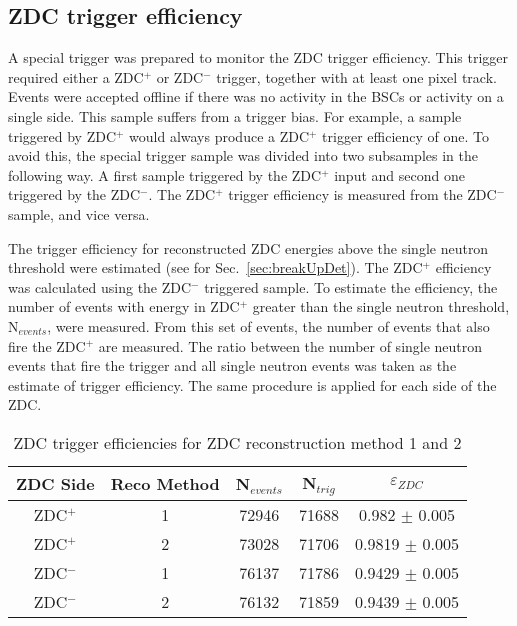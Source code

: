     \subsection{ZDC trigger efficiency}
      A special trigger was prepared to monitor the ZDC trigger efficiency. 
      This trigger required either a ZDC$^{+}$ or ZDC$^{-}$ trigger, together with at 
        least one pixel track. 
      Events were accepted offline if there was no activity in the BSCs or 
        activity on a single side. 
      This sample suffers from a trigger bias. 
      For example, a sample triggered by ZDC$^{+}$ would always produce a ZDC$^{+}$ 
        trigger efficiency of one. 
      To avoid this, the special trigger sample was divided into two 
        subsamples in the following way. 
      A first sample triggered by the ZDC$^{+}$ input and second one triggered by 
        the ZDC$^{-}$. 
      The ZDC$^{+}$ trigger efficiency is measured from the ZDC$^{-}$ sample, and vice 
        versa.

      The trigger efficiency for reconstructed ZDC energies above the
        single neutron threshold were estimated (see for Sec.~\ref{sec:breakUpDet}).
      The ZDC$^{+}$ efficiency was calculated using the ZDC$^{-}$ triggered 
        sample.
      To estimate the efficiency, the number of events with energy in 
        ZDC$^{+}$ greater than the single neutron threshold, N$_{events}$, 
        were measured.
      From this set of events, the number of events that also fire the 
        ZDC$^{+}$ are measured.
      The ratio between the number of single neutron events that fire the 
        trigger and all single neutron events was taken as the estimate of 
        trigger efficiency. 
      The same procedure is applied for each side of the ZDC. 

      \begin{table}
        \centering
        \begin{tabular}{|c|c|c|c|c|}
           ZDC Side & Reco Method & N$_{events}$ & N$_{trig}$ & $\varepsilon_{ZDC}$ \\ \hline
           ZDC$^{+}$ & 1 & 72946  & 71688 & 0.982 $\pm$ 0.005 \\ \hline
           ZDC$^{+}$ & 2 & 73028  & 71706  & 0.9819  $\pm$ 0.005  \\ \hline
           ZDC$^{-}$ & 1 & 76137  & 71786  & 0.9429  $\pm$ 0.005  \\ \hline
           ZDC$^{-}$ & 2 & 76132  & 71859  & 0.9439  $\pm$ 0.005  \\ \hline
        \end{tabular}
        \caption{ZDC trigger efficiencies for ZDC reconstruction method 1 and 
          2}
        \label{tab:zdcEfficiency}
      \end{table}
